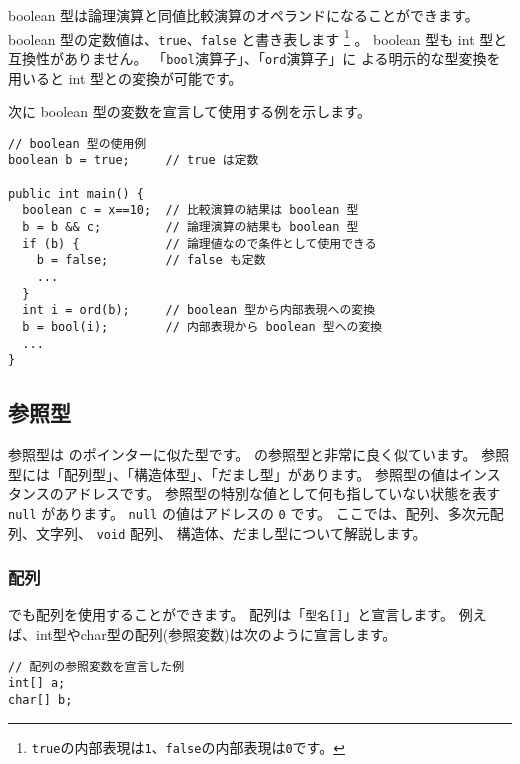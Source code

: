 boolean 型は論理演算と同値比較演算のオペランドになることができます。
boolean 型の定数値は、\verb/true/、\verb/false/ と書き表します
\footnote{{\tt true}の内部表現は{\tt 1}、{\tt false}の内部表現は{\tt 0}です。}
。
boolean 型も int 型と互換性がありません。
「\verb/bool/演算子」、「\verb/ord/演算子」に
よる明示的な型変換を用いると int 型との変換が可能です。

次に boolean 型の変数を宣言して使用する例を示します。

\begin{mylist}
\begin{verbatim}
// boolean 型の使用例
boolean b = true;     // true は定数

public int main() {
  boolean c = x==10;  // 比較演算の結果は boolean 型
  b = b && c;         // 論理演算の結果も boolean 型
  if (b) {            // 論理値なので条件として使用できる
    b = false;        // false も定数
    ...
  }
  int i = ord(b);     // boolean 型から内部表現への変換
  b = bool(i);        // 内部表現から boolean 型への変換
  ...
}
\end{verbatim}
\end{mylist}

\subsection{参照型}
\label{chap3:ref}

参照型は \cl のポインターに似た型です。
\javal の参照型と非常に良く似ています。
参照型には「配列型」、「構造体型」、「だまし型」があります。
参照型の値はインスタンスのアドレスです。
参照型の特別な値として何も指していない状態を表す \verb/null/ があります。
\verb/null/ の値はアドレスの \verb/0/ です。
ここでは、配列、多次元配列、文字列、 \verb/void/ 配列、
構造体、だまし型について解説します。

\subsubsection{配列}
\label{chap3:array}
\cmml でも配列を使用することができます。
配列は「\verb/型名[]/」と宣言します。
例えば、int型やchar型の配列(参照変数)は次のように宣言します。

\begin{mylist}
\begin{verbatim}
// 配列の参照変数を宣言した例
int[] a;
char[] b;
\end{verbatim}
\end{mylist}


